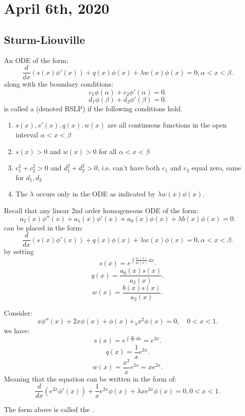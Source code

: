 \documentclass[../main/main.tex]{subfiles}
\begin{document}
\section{April 6th, 2020}
\subsection{Sturm-Liouville}
\begin{definition}
	An ODE of the form: \[
		\frac{d}{dx}\left( s(x) \phi'(x) \right) +q(x) \phi(x) + \lambda w(x) \phi(x) = 0, \alpha < x < \beta
	.\] along with the boundary conditions: \[
	c_1\phi(\alpha) + c_2 \phi'( \alpha)  = 0
	.\] \[
	d_1 \phi(\beta) + d_2 \phi'(\beta) = 0
.\] is called a  (denoted RSLP) if the following conditions hold.
\begin{enumerate}
	\item $s(x), s'(x), q(x),w(x)$ are all continuous functions in the open interval $\alpha < x < \beta$
	\item   $s(x) >0$ and $w(x) > 0$ for all $\alpha < x < \beta$
	\item  $c_1^2+c_2^2>0$ and $d_1^2+d_2^2>0$, i.e. can't have both $c_1$ and $c_2$ equal zero, same for $d_1, d_2$ 
	\item The $\lambda$ occurs only in the ODE as indicated by $\lambda w(x) \phi(x)$.
\end{enumerate}
\end{definition}
Recall that any linear 2nd order homogeneous ODE of the form: \[
	a_2(x) \phi''(x) + a_1(x) \phi'(x) + a_0(x) \phi(x) + \lambda b(x) \phi(x) = 0
.\] can be placed in the form: \[ \frac{d}{dx}\left( s(x) \phi'(x) \right) +q(x) \phi(x) + \lambda w(x) \phi(x) = 0, \alpha < x < \beta 
.\] by setting  \[
s(x) = e^{\int \frac{a_1(x)}{a_2(x)}~dx}
.\] \[
q(x) = \frac{a_0(x) s(x)}{a_2(x)}
.\] \[
w(x) = \frac{b(x) s(x) }{a_2(x)}
.\] 
\begin{example}
	Consider: \[
		x\phi''(x) + 2x\phi(x) + \phi(x) +_ \lambda x^2\phi(x) = 0, \quad 0 < x < 1
	.\] we have: \[
	s(x) = e^{\int \frac{2x}{x}~dx}= e^{2x}
	.\] \[
	q(x) = \frac{1}{x}e^{2x}
	.\] \[
	w(x) = \frac{x^2}{x}e^{2x} = xe^{2x}
	.\] Meaning that the equation can be written in the form of: \[
	\frac{d}{dx}\left( e^{2x}\phi'(x) \right) +\frac{1}{x}e^{2x}\phi(x) + \lambda xe^{2x}\phi(x) = 0, 0 < x < 1
	.\] 
\end{example}
\begin{remark}
	The form above is called the .
\end{remark}
\end{document}
